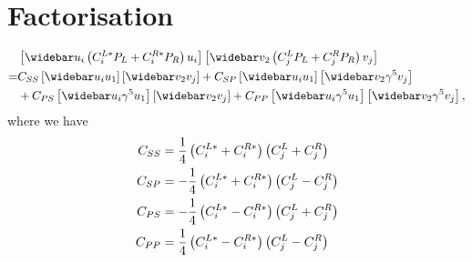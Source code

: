 \documentclass[english,notitlepage]{article}
\begin{document}
\section{Factorisation}

    \begin{align}
        \nonumber
          & \bclosed{\wbar{u}_i \pclosed{C^{L*}_i P_L + C^{R*}_i P_R} u_i} \bclosed{\wbar{v}_2 \pclosed{C^{L}_j P_L + C^R_j P_R} v_j}                       \\
        \nonumber
        = & C_{SS}\bclosed{\wbar{u}_i u_1} \bclosed{\wbar{v}_2 v_j} + C_{SP}\bclosed{\wbar{u}_i u_1} \bclosed{\wbar{v}_2 \gamma^5 v_j}                      \\
          & + C_{PS}\bclosed{\wbar{u}_i \gamma^5 u_1} \bclosed{\wbar{v}_2 v_j} + C_{PP}\bclosed{\wbar{u}_i \gamma^5 u_1} \bclosed{\wbar{v}_2 \gamma^5 v_j},
    \end{align}
    where we have
    \begin{subequations}
        \begin{align}
            C_{SS} & = \frac{1}{4} \left(C^{L*}_i + C^{R*}_i\right)\left(C^{L}_j + C^{R}_j\right)  \\
            C_{SP} & = -\frac{1}{4} \left(C^{L*}_i + C^{R*}_i\right)\left(C^{L}_j - C^{R}_j\right) \\
            C_{PS} & = -\frac{1}{4} \left(C^{L*}_i - C^{R*}_i\right)\left(C^{L}_j + C^{R}_j\right) \\
            C_{PP} & = \frac{1}{4} \left(C^{L*}_i - C^{R*}_i\right)\left(C^{L}_j - C^{R}_j\right)
        \end{align}
    \end{subequations}
\end{document}
